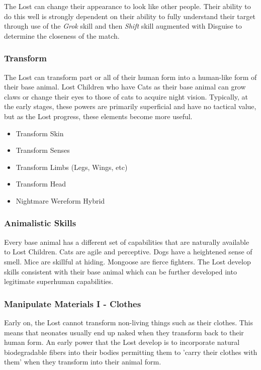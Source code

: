 \documentclass[letterpaper,serif]{rpg-module}
\begin{document}
The Lost can change their appearance to look like other people. Their ability to do this well is strongly dependent on their ability to fully understand their target through use of the \textit{Grok} skill and then \textit{Shift} skill augmented with Disguise to determine the closeness of the match. 

\subsubsection{Transform}

The Lost can transform part or all of their human form into a human-like form of their base animal. Lost Children who have Cats as their base animal can grow claws or change their eyes to those of cats to acquire night vision. Typically, at the early stages, these powers are primarily superficial and have no tactical value, but as the Lost progress, these elements become more useful. 

\begin{itemize}
	\item Transform Skin
	\item Transform Senses
	\item Transform Limbs (Legs, Wings, etc)
	\item Transform Head
	\item Nightmare Wereform Hybrid
\end{itemize}

\subsubsection{Animalistic Skills}

Every base animal has a different set of capabilities that are naturally available to Lost Children. Cats are agile and perceptive. Dogs have a heightened sense of smell. Mice are skillful at hiding. Mongoose are fierce fighters. The Lost develop skills consistent with their base animal which can be further developed into legitimate superhuman capabilities.  
	
\subsubsection{Manipulate Materials I - Clothes} 

Early on, the Lost cannot transform non-living things such as their clothes. This means that neonates usually end up naked when they transform back to their human form. An early power that the Lost develop is to incorporate natural biodegradable fibers into their bodies permitting them to 'carry their clothes with them' when they transform into their animal form.  
\end{document}
